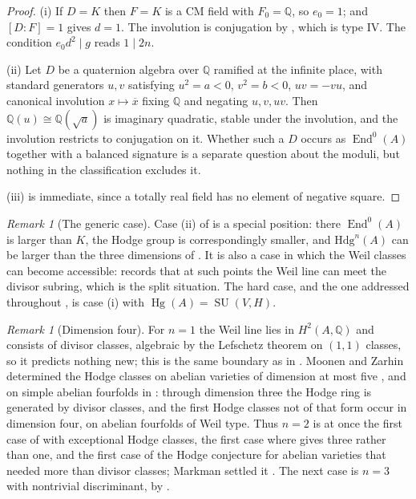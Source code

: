 \documentclass[11pt,reqno]{amsart}
\theoremstyle{plain}
\theoremstyle{definition}
\theoremstyle{remark}
\newtheorem{remark}[theorem]{Remark}
\newcommand{\QQ}{\mathbb{Q}}
\newcommand{\Hdg}{\mathrm{Hdg}}
\DeclareMathOperator{\End}{End}
\DeclareMathOperator{\Hg}{Hg}
\DeclareMathOperator{\SU}{SU}
\newcommand{\bbar}[1]{\overline{#1}}
\begin{document}
\begin{proof}
(i) If $D=K$ then $F=K$ is a CM field with $F_{0}=\QQ$, so $e_{0}=1$; and
$[D:F]=1$ gives $d=1$. The involution is conjugation by
, which is type IV. The condition $e_{0}d^{2}\mid g$ reads
$1\mid 2n$.

(ii) Let $D$ be a quaternion algebra over $\QQ$ ramified at the infinite place,
with standard generators $u,v$ satisfying $u^{2}=a<0$, $v^{2}=b<0$, $uv=-vu$,
and canonical involution $x\mapsto\bbar{x}$ fixing $\QQ$ and negating
$u,v,uv$. Then $\QQ(u)\cong\QQ(\sqrt{a})$ is imaginary quadratic, stable under
the involution, and the involution restricts to conjugation on it. Whether
such a $D$ occurs as $\End^{0}(A)$ together with a balanced signature
is a separate question about the moduli, but nothing in the classification
excludes it.

(iii) is immediate, since a totally real field has no element of negative
square.
\end{proof}

\begin{remark}[The generic case]\label{rem:genericcase}
Case (ii) of  is a special position: there
$\End^{0}(A)$ is larger than $K$, the Hodge group is correspondingly smaller,
and $\Hdg^{n}(A)$ can be larger than the three dimensions of
. It is also a case in which the Weil classes can become
accessible: \cite[Remark~2.5]{paperIII} records that at such points the Weil line can
meet the divisor subring, which is the split situation. The hard case, and the
one addressed throughout , is
case (i) with $\Hg(A)=\SU(V,H)$.
\end{remark}

\begin{remark}[Dimension four]\label{rem:dimfour}
For $n=1$ the Weil line lies in $H^{2}(A,\QQ)$ and consists of divisor
classes, algebraic by the Lefschetz theorem on $(1,1)$ classes, so it predicts
nothing new; this is the same boundary as in . Moonen and
Zarhin determined the Hodge classes on abelian varieties of dimension at most
five \cite{MZ99}, and on simple abelian fourfolds in \cite{MZ95}: through
dimension three the Hodge ring is generated by divisor classes, and the first
Hodge classes not of that form occur in dimension four, on abelian fourfolds of
Weil type. Thus $n=2$ is at once the first case of  with
exceptional Hodge classes, the first case where  gives
three rather than one, and the first case of the Hodge conjecture for
abelian varieties that needed more than divisor classes; Markman settled it
\cite[Corollary 1.6.1]{Mar25a}. The next case is $n=3$ with nontrivial
discriminant, by \cite[Proposition~2.12(ii)]{paperIII}.
\end{remark}
\end{document}
